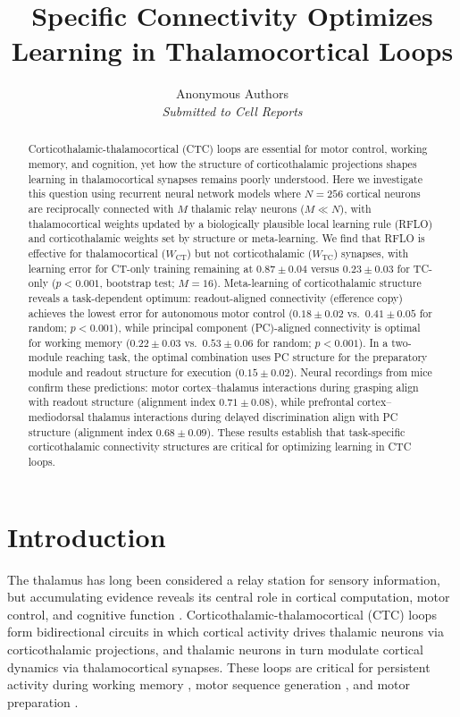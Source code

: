 \documentclass[11pt]{article}
\title{Specific Connectivity Optimizes Learning in Thalamocortical Loops}
\author{
  Anonymous Authors\\
  \textit{Submitted to Cell Reports}
}
\date{}
\begin{document}
\maketitle

\begin{abstract}
Corticothalamic-thalamocortical (CTC) loops are essential for motor control, working memory, and cognition, yet how the structure of corticothalamic projections shapes learning in thalamocortical synapses remains poorly understood. Here we investigate this question using recurrent neural network models where $N = 256$ cortical neurons are reciprocally connected with $M$ thalamic relay neurons ($M \ll N$), with thalamocortical weights updated by a biologically plausible local learning rule (RFLO) and corticothalamic weights set by structure or meta-learning. We find that RFLO is effective for thalamocortical ($W_{\text{CT}}$) but not corticothalamic ($W_{\text{TC}}$) synapses, with learning error for CT-only training remaining at $0.87 \pm 0.04$ versus $0.23 \pm 0.03$ for TC-only ($p < 0.001$, bootstrap test; $M = 16$). Meta-learning of corticothalamic structure reveals a task-dependent optimum: readout-aligned connectivity (efference copy) achieves the lowest error for autonomous motor control ($0.18 \pm 0.02$ vs.\ $0.41 \pm 0.05$ for random; $p < 0.001$), while principal component (PC)-aligned connectivity is optimal for working memory ($0.22 \pm 0.03$ vs.\ $0.53 \pm 0.06$ for random; $p < 0.001$). In a two-module reaching task, the optimal combination uses PC structure for the preparatory module and readout structure for execution ($0.15 \pm 0.02$). Neural recordings from mice confirm these predictions: motor cortex--thalamus interactions during grasping align with readout structure (alignment index $0.71 \pm 0.08$), while prefrontal cortex--mediodorsal thalamus interactions during delayed discrimination align with PC structure (alignment index $0.68 \pm 0.09$). These results establish that task-specific corticothalamic connectivity structures are critical for optimizing learning in CTC loops.
\end{abstract}

\section{Introduction}

The thalamus has long been considered a relay station for sensory information, but accumulating evidence reveals its central role in cortical computation, motor control, and cognitive function \citep{sherman2007thalamus, halassa2018thalamic}. Corticothalamic-thalamocortical (CTC) loops form bidirectional circuits in which cortical activity drives thalamic neurons via corticothalamic projections, and thalamic neurons in turn modulate cortical dynamics via thalamocortical synapses. These loops are critical for persistent activity during working memory \citep{guo2017maintenance, schmitt2017thalamic}, motor sequence generation \citep{logiaco2021thalamic}, and motor preparation \citep{kao2021optimal, inagaki2022neural}.
\end{document}
